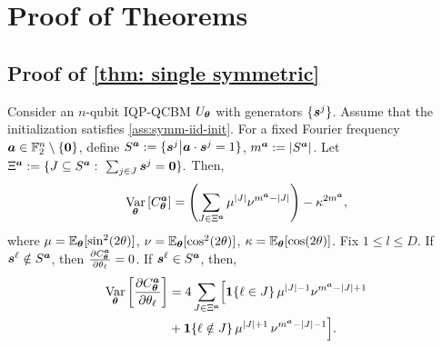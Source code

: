 \documentclass{article}
\theoremstyle{plain}
\theoremstyle{definition}
\theoremstyle{remark}
\begin{document}
\section{Proof of Theorems}

\subsection{Proof of \cref{thm: single symmetric}}
Consider an $n$-qubit IQP-QCBM $U_{\bm{\theta}}$ with generators $\{{\bm{s}^j}\}$. Assume that the initialization satisfies \cref{ass:symm-iid-init}. For a fixed Fourier frequency ${\bm{a}} \in \mathbb{F}_2^n \setminus \{\mathbf{0}\}$, define $S^{{\bm{a}}} := \{ {\bm{s}^j} \big| {\bm{a}} \cdot {\bm{s}^j} = 1 \}$, $
m^{\bm{a}} := \abs{S^{{\bm{a}}}}$. Let $
\Xi^\vta:= \{J\subseteq S^\vta:\ \sum_{j\in J}\vtsj=\mathbf 0 \}.$ Then, 
\begin{equation}
     \operatorname*{Var}_{\bm{\theta}} \left[ C^{\bm{a}}_{\bm{\theta}} \right] = 
\left(\sum_{J\in \Xi^{\bm{a}}} \mu^{|J|} \nu^{m^{\bm{a}}-|J|}\right) - \kappa^{2m^{\bm{a}}},
\end{equation}
where $\mu=\operatorname*{\mathbb{E}}_{{\bm{\theta}}}[\sin^2(2\theta)]$, $\nu=\operatorname*{\mathbb{E}}_{{\bm{\theta}}}[\cos^2(2\theta)]$, $\kappa=\operatorname*{\mathbb{E}}_{{\bm{\theta}}}[\cos(2\theta)]$. Fix $1\leq l \leq D$. If ${\bm{s}^\ell} \notin S^{\bm{a}}$, then $ \frac{\partial C^{\bm{a}}_{\bm{\theta}}}{\partial \theta_\ell}=0$. If ${\bm{s}^\ell} \in S^{\bm{a}}$, then, 
\begin{align}
\operatorname*{Var}_{\bm{\theta}} \left[ \frac{\partial C^{\bm{a}}_{\bm{\theta}}}{\partial \theta_\ell} \right]
&= 4\sum_{J\in \Xi^{\bm{a}}}
\Bigl[
\bm{1}\{\ell\in J\}\,\mu^{|J|-1}\nu^{m^{\bm{a}}-|J|+1} \notag
\\&+
\bm{1}\{\ell\notin J\}\,\mu^{|J|+1}\,\nu^{m^{\bm{a}}-|J|-1}\Bigr].
\label{eq: symmetric variance}
\end{align}
\end{document}
